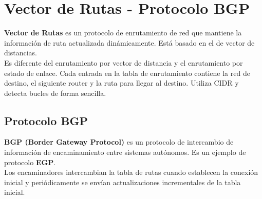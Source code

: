 \section{Vector de Rutas - Protocolo BGP}
\textbf{Vector de Rutas} es un protocolo de enrutamiento de red que mantiene la información de ruta actualizada dinámicamente. Está basado en el de vector de distancias.\\

Es diferente del enrutamiento por vector de distancia y el enrutamiento por estado de enlace. Cada entrada en la tabla de enrutamiento contiene la red de destino, el siguiente router y la ruta para llegar al destino. Utiliza CIDR y detecta bucles de forma sencilla.
\subsection{Protocolo BGP}
\textbf{BGP (Border Gateway Protocol)} es un protocolo de intercambio de información de encaminamiento entre sistemas autónomos. Es un ejemplo de protocolo \textbf{EGP}.\\

Los encaminadores intercambian la tabla de rutas cuando establecen la conexión inicial y periódicamente se envían actualizaciones incrementales de la tabla inicial.
